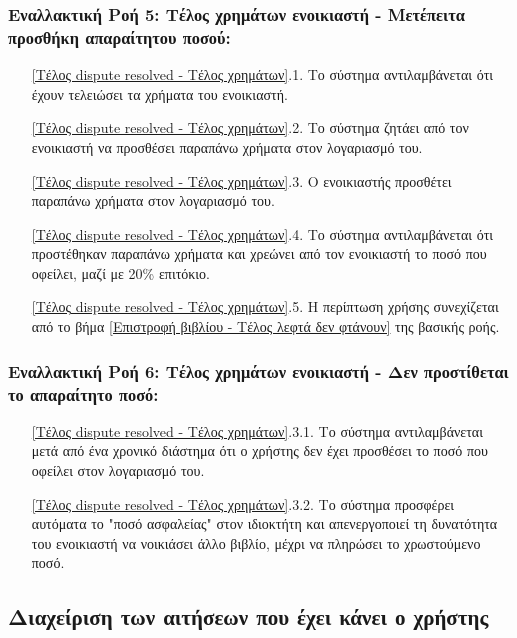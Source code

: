 \documentclass[12pt,a4paper]{article}
\begin{document}
\subsubsection*{Εναλλακτική Ροή 5: Τέλος χρημάτων ενοικιαστή - Μετέπειτα προσθήκη απαραίτητου ποσού:}
\begin{enumerate}
    \item[\ref{Τέλος dispute resolved - Τέλος χρημάτων}.1.] Το σύστημα αντιλαμβάνεται ότι έχουν τελειώσει τα χρήματα του ενοικιαστή.
    \item[\ref{Τέλος dispute resolved - Τέλος χρημάτων}.2.] Το σύστημα ζητάει από τον ενοικιαστή να προσθέσει παραπάνω χρήματα στον λογαριασμό του.
    \item[\ref{Τέλος dispute resolved - Τέλος χρημάτων}.3.] Ο ενοικιαστής προσθέτει παραπάνω χρήματα στον λογαριασμό του.
    \item[\ref{Τέλος dispute resolved - Τέλος χρημάτων}.4.] Το σύστημα αντιλαμβάνεται ότι προστέθηκαν παραπάνω χρήματα και χρεώνει από τον ενοικιαστή το ποσό που οφείλει, μαζί με 20\% επιτόκιο.
    \item[\ref{Τέλος dispute resolved - Τέλος χρημάτων}.5.] Η περίπτωση χρήσης συνεχίζεται από το βήμα \ref{Επιστροφή βιβλίου - Τέλος λεφτά δεν φτάνουν} της βασικής ροής.
\end{enumerate}

\subsubsection*{Εναλλακτική Ροή 6: Τέλος χρημάτων ενοικιαστή - Δεν προστίθεται το απαραίτητο ποσό:}
\begin{enumerate}
    \item[\ref{Τέλος dispute resolved - Τέλος χρημάτων}.3.1.] Το σύστημα αντιλαμβάνεται μετά από ένα χρονικό διάστημα ότι ο χρήστης δεν έχει προσθέσει το ποσό που οφείλει στον λογαριασμό του.
    \item[\ref{Τέλος dispute resolved - Τέλος χρημάτων}.3.2.] Το σύστημα προσφέρει αυτόματα το "ποσό ασφαλείας" στον ιδιοκτήτη και απενεργοποιεί τη δυνατότητα του ενοικιαστή να νοικιάσει άλλο βιβλίο, μέχρι να πληρώσει το χρωστούμενο ποσό.
\end{enumerate}

\subsection{Διαχείριση των αιτήσεων που έχει κάνει ο χρήστης}
\end{document}
